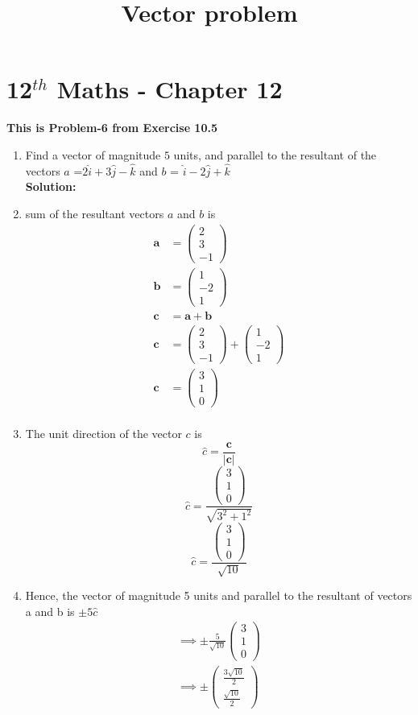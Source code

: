 \documentclass[12pt]{article}
\newcommand{\myvec}[1]{\ensuremath{\begin{pmatrix}#1\end{pmatrix}}}
\let\vec\mathbf
\begin{document}
\begin{center}
\title{\textbf{Vector problem}}
\date{\vspace{-5ex}} %
\maketitle
\end{center}
\setcounter{page}{1}
\section{12$^{th}$ Maths - Chapter 12}
\textbf{This is Problem-6 from Exercise 10.5}
\begin{enumerate}
\item Find a vector of magnitude $5$ units, and parallel to the resultant of the vectors $a$ =$2\hat{i}+3\hat{j}-\hat{k}$ and $b$ = $\hat{i}-2\hat{j}+\hat{k}$\\
\textbf{Solution:}\\
\item sum of the resultant vectors $a$ and $b$ is
\begin{align} 
\vec{a}&=\myvec{2\\3\\-1}\\
\vec{b}&=\myvec{1\\-2\\1}\\
\vec{c}&=\vec{a}+\vec{b}\\
\vec{c}&=\myvec{2\\3\\-1} + \myvec{1\\-2\\1}\\
\vec{c}&=\myvec{3\\1\\0}\\
\end{align}   
\item The unit direction of the vector $c$ is \\
 \[ \hat{c}=\frac{\vec{c}}{\left | \vec{c} \right |} \]
 \[ \hat{c}=\frac{\myvec{3\\1\\0}}{\sqrt{3^2 + 1^2}}\]
 \[ \hat{c}=\frac{\myvec{3\\1\\0}}{\sqrt{10}}\]
 \item Hence, the vector of magnitude 5 units and parallel to the resultant of vectors a and b is $\pm 5\hat{c}$\\
 \begin{align}
  \implies \pm \frac{5}{\sqrt{10}} \myvec{3\\1\\0}\\
  \implies \pm \myvec{{\frac{3\sqrt{10}}{2}}\\{\frac{\sqrt{10}}{2}}}
 \end{align}
\end{enumerate} 
\end{document}
